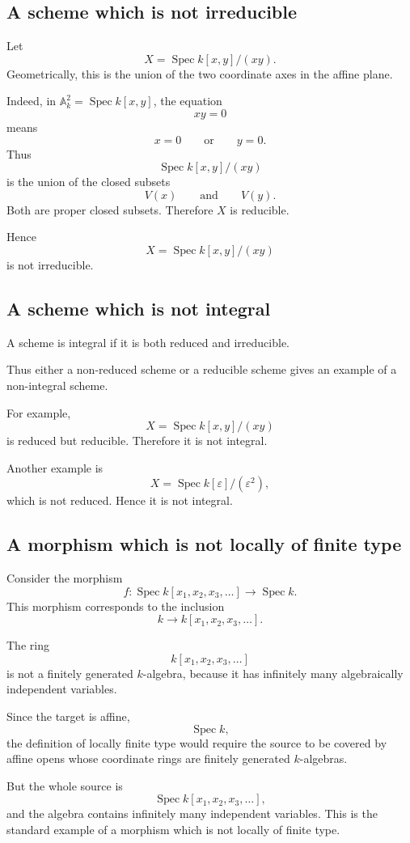 \documentclass[12pt,a4paper]{article}
\DeclareMathOperator{\Spec}{Spec}
\providecommand{\Spec}{\operatorname{Spec}}
\theoremstyle{notespace}
\begin{document}
\subsection*{A scheme which is not irreducible}

Let
\[
X=\Spec k[x,y]/(xy).
\]
Geometrically, this is the union of the two coordinate axes in the affine plane.

Indeed, in \(\mathbb A_k^2=\Spec k[x,y]\), the equation
\[
xy=0
\]
means
\[
x=0
\qquad\text{or}\qquad
y=0.
\]
Thus
\[
\Spec k[x,y]/(xy)
\]
is the union of the closed subsets
\[
V(x)
\qquad\text{and}\qquad
V(y).
\]
Both are proper closed subsets. Therefore \(X\) is reducible.

Hence
\[
X=\Spec k[x,y]/(xy)
\]
is not irreducible.

\subsection*{A scheme which is not integral}

A scheme is integral if it is both reduced and irreducible.

Thus either a non-reduced scheme or a reducible scheme gives an example of a non-integral scheme.

For example,
\[
X=\Spec k[x,y]/(xy)
\]
is reduced but reducible. Therefore it is not integral.

Another example is
\[
X=\Spec k[\varepsilon]/(\varepsilon^2),
\]
which is not reduced. Hence it is not integral.

\subsection*{A morphism which is not locally of finite type}

Consider the morphism
\[
f:\Spec k[x_1,x_2,x_3,\dots]\longrightarrow \Spec k.
\]
This morphism corresponds to the inclusion
\[
k\longrightarrow k[x_1,x_2,x_3,\dots].
\]

The ring
\[
k[x_1,x_2,x_3,\dots]
\]
is not a finitely generated \(k\)-algebra, because it has infinitely many algebraically independent variables.

Since the target is affine,
\[
\Spec k,
\]
the definition of locally finite type would require the source to be covered by affine opens whose coordinate rings are finitely generated \(k\)-algebras.

But the whole source is
\[
\Spec k[x_1,x_2,x_3,\dots],
\]
and the algebra contains infinitely many independent variables. This is the standard example of a morphism which is not locally of finite type.
\end{document}
